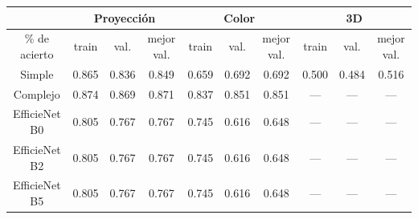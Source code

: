 \documentclass[a4paper,12pt,twoside,titlepage]{article}
\begin{document}
\begin{table}[h!]

  \centering
  \begin{tabular}{cccccccccc}
  \hline
  \multicolumn{1}{|c|}{}                       & \multicolumn{3}{c|}{Proyección}                                                           & \multicolumn{3}{c|}{Color}                                                                & \multicolumn{3}{c|}{3D}                                                                   \\ \hline
  \multicolumn{1}{|c|}{\% de acierto} & \multicolumn{1}{c|}{train} & \multicolumn{1}{c|}{val.}  & \multicolumn{1}{c|}{mejor val.} & \multicolumn{1}{c|}{train} & \multicolumn{1}{c|}{val.}  & \multicolumn{1}{c|}{mejor val.} & \multicolumn{1}{c|}{train} & \multicolumn{1}{c|}{val.}  & \multicolumn{1}{c|}{mejor val.} \\ \hline
  \multicolumn{1}{|c|}{Simple}                 & \multicolumn{1}{c|}{0.865} & \multicolumn{1}{c|}{0.836} & \multicolumn{1}{c|}{0.849}      & \multicolumn{1}{c|}{0.659} & \multicolumn{1}{c|}{0.692} & \multicolumn{1}{c|}{0.692}      & \multicolumn{1}{c|}{0.500} & \multicolumn{1}{c|}{0.484} & \multicolumn{1}{c|}{0.516}      \\ \hline
  \multicolumn{1}{|c|}{Complejo}               & \multicolumn{1}{c|}{0.874} & \multicolumn{1}{c|}{0.869} & \multicolumn{1}{c|}{0.871}      & \multicolumn{1}{c|}{0.837} & \multicolumn{1}{c|}{0.851} & \multicolumn{1}{c|}{0.851}      & \multicolumn{1}{c|}{---}   & \multicolumn{1}{c|}{---}   & \multicolumn{1}{c|}{---}        \\ \hline
  \multicolumn{1}{|c|}{EfficieNet B0}          & \multicolumn{1}{c|}{0.805} & \multicolumn{1}{c|}{0.767} & \multicolumn{1}{c|}{0.767}      & \multicolumn{1}{c|}{0.745} & \multicolumn{1}{c|}{0.616} & \multicolumn{1}{c|}{0.648}      & \multicolumn{1}{c|}{---}   & \multicolumn{1}{c|}{---}   & \multicolumn{1}{c|}{---}        \\ \hline
  \multicolumn{1}{|c|}{EfficieNet B2}          & \multicolumn{1}{c|}{0.805} & \multicolumn{1}{c|}{0.767} & \multicolumn{1}{c|}{0.767}      & \multicolumn{1}{c|}{0.745} & \multicolumn{1}{c|}{0.616} & \multicolumn{1}{c|}{0.648}      & \multicolumn{1}{c|}{---}   & \multicolumn{1}{c|}{---}   & \multicolumn{1}{c|}{---}        \\ \hline
  \multicolumn{1}{|c|}{EfficieNet B5}          & \multicolumn{1}{c|}{0.805} & \multicolumn{1}{c|}{0.767} & \multicolumn{1}{c|}{0.767}      & \multicolumn{1}{c|}{0.745} & \multicolumn{1}{c|}{0.616} & \multicolumn{1}{c|}{0.648}      & \multicolumn{1}{c|}{---}   & \multicolumn{1}{c|}{---}   & \multicolumn{1}{c|}{---}        \\ \hline

\end{tabular}
\end{table}
\end{document}
